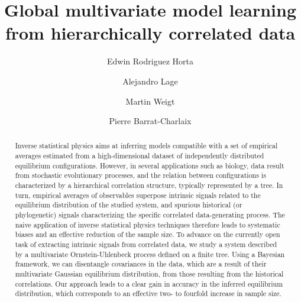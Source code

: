 \documentclass[preprint,amsmath,amssymb,superscriptaddress,showpacs,pre]{revtex4-1}
\begin{document}
\title{Global multivariate model learning from hierarchically correlated data}

\author{Edwin Rodriguez Horta} 
%
\author{Alejandro Lage} 
%
\author{Martin Weigt} 
% 

\author{Pierre Barrat-Charlaix} 




\begin{abstract}
Inverse statistical physics aims at inferring models compatible with a set of empirical averages estimated from a high-dimensional dataset of independently distributed equilibrium configurations. However, in several applications such as biology, data result from stochastic evolutionary processes, and the relation between configurations is characterized by a hierarchical correlation structure, typically represented by a tree. In turn, empirical averages of observables superpose intrinsic signals related to the equilibrium distribution of the studied system, and spurious historical (or phylogenetic) signals characterizing the specific correlated data-generating process. The naive application of inverse statistical physics techniques therefore leads to systematic biases and an effective reduction of the sample size. To advance on the currently open task of extracting intrinsic signals from correlated data, we study a system described by a multivariate Ornstein-Uhlenbeck process defined on a finite tree. Using a Bayesian framework, we can disentangle covariances in the data, which are a result of their multivariate Gaussian equilibrium distribution, from those resulting from the historical correlations. Our approach leads to a clear gain in accuracy in the inferred equilibrium distribution, which corresponds to an effective two- to fourfold increase in sample size.
\end{abstract}
\end{document}
